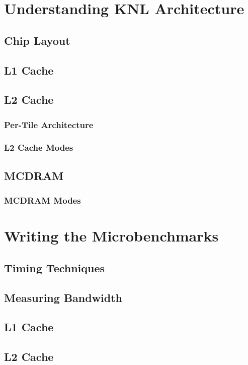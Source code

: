 \documentclass[bsc,frontabs,twoside,singlespacing,parskip,deptreport]{infthesis}     %
\begin{document}
\newpage

\chapter{Understanding KNL Architecture}
\section{Chip Layout}
\newpage

\section{L1 Cache}
\newpage

\section{L2 Cache}
\subsection{Per-Tile Architecture}
\subsection{L2 Cache Modes}
\newpage

\section{MCDRAM}
\subsection{MCDRAM Modes}
\newpage

\chapter{Writing the Microbenchmarks}
\section{Timing Techniques}
\newpage

\section{Measuring Bandwidth}
\newpage

\section{L1 Cache}
\section{L2 Cache}
\end{document}
